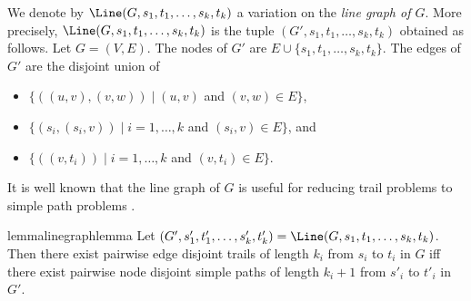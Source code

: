 \documentclass[a4paper,english]{lipics-v2016}
\theoremstyle{plain}
\begin{document}
We denote by $\Line(G,s_1,t_1,\ldots,s_k,t_k)$ a variation on the
\emph{line graph of $G$}. More precisely,
$\Line(G,s_1,t_1,\ldots,s_k,t_k)$ is the tuple
$(G',s_1,t_1,\ldots,s_k,t_k)$ obtained as follows. Let $G =
(V,E)$. The nodes of
$G'$ are $E \cup \{s_1,t_1,\ldots,s_k,t_k\}$. The edges of $G'$ are
the disjoint union of
\begin{itemize}
\item $\{((u,v),(v,w)) \mid (u,v)$ and $(v,w) \in E\}$,
\item $\{(s_i,(s_i,v)) \mid i = 1,\ldots,k$ and $(s_i,v) \in E\}$, and
\item $\{((v,t_i)) \mid i = 1,\ldots,k$ and $(v,t_i) \in E\}$.
\end{itemize}
It is well known that the line graph of $G$ is useful for reducing
trail problems to simple path problems \cite[Proof of Lemma 2]{LapaughR-jcss80}.
\begin{restatable}{lemma}{linegraphlemma}\label{lem:linegraph}
  Let $(G',s'_1,t'_1,\ldots,s'_k,t'_k) =
  \Line(G,s_1,t_1,\ldots,s_k,t_k)$. Then there exist pairwise edge
  disjoint trails of length $k_i$ from $s_i$ to $t_i$ in $G$ iff there
  exist pairwise node disjoint simple paths of length $k_i+1$ from
  $s'_i$ to $t'_i$ in $G'$.
\end{restatable}










        












 
\end{document}
